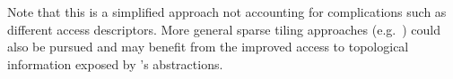 \documentclass[thesis]{subfiles}
\begin{document}
Note that this is a simplified approach not accounting for complications such as different access descriptors.
More general sparse tiling approaches (e.g.~\cite{kriegerLoopChainingProgramming2013,stroutGeneralizingRunTimeTiling2014,luporiniAutomatedTilingUnstructured2019}) could also be pursued and may benefit from the improved access to topological information exposed by 's abstractions.
\end{document}
